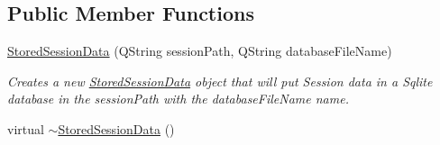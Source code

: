 \subsection*{Public Member Functions}
\begin{DoxyCompactItemize}
\item 
\hypertarget{class_stored_session_data_ad5633aa27b748431e835a6be90c04238}{\hyperlink{class_stored_session_data_ad5633aa27b748431e835a6be90c04238}{Stored\-Session\-Data} (Q\-String session\-Path, Q\-String database\-File\-Name)}\label{class_stored_session_data_ad5633aa27b748431e835a6be90c04238}

\begin{DoxyCompactList}\small\item\em Creates a new \hyperlink{class_stored_session_data}{Stored\-Session\-Data} object that will put Session data in a Sqlite database in the session\-Path with the database\-File\-Name name. \end{DoxyCompactList}\item 
\hypertarget{class_stored_session_data_a71ce0fb4b14e50493e38515927205ac8}{virtual \hyperlink{class_stored_session_data_a71ce0fb4b14e50493e38515927205ac8}{$\sim$\-Stored\-Session\-Data} ()}\label{class_stored_session_data_a71ce0fb4b14e50493e38515927205ac8}


\end{DoxyCompactItemize}
